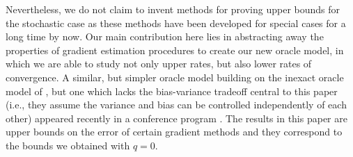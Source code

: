 Nevertheless, we do not claim to invent methods for proving upper bounds for the stochastic case
as these methods have been developed for special cases for a long time by now. 
Our main contribution here lies in abstracting away the properties of gradient estimation procedures 
to create our new oracle model, in which we are able to study not only upper rates, but also lower rates of convergence.
A similar, but simpler oracle model building on the inexact oracle model of  \cite{DeGliNe14}, 
but one which lacks the bias-variance tradeoff central to this paper (i.e., they assume the variance and bias can be controlled independently of each other) appeared recently in a conference program \citep{DvoGa15}. The results in this paper are upper bounds on the error of certain gradient methods and they correspond to the bounds we obtained with $q=0$.


